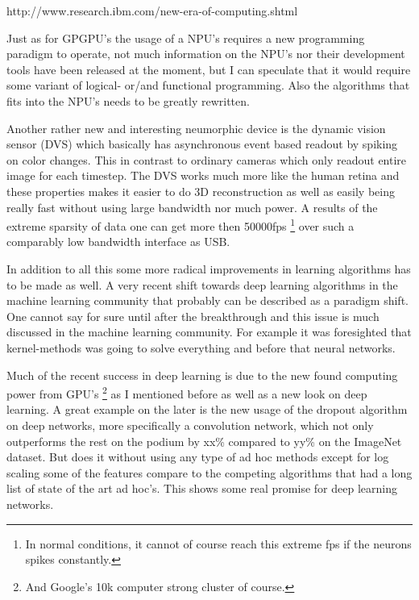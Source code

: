 \documentclass{article}
\begin{document}
    http://www.research.ibm.com/new-era-of-computing.shtml 

    Just as for GPGPU's the usage of a NPU's requires a new programming paradigm to
    operate, not much information on the NPU's nor their development tools
    have been released at the moment, but I can speculate that it would
    require some variant of logical- or/and functional programming. 
    Also the algorithms that fits into the
    NPU's needs to be greatly rewritten.
    
    Another rather new and interesting neumorphic device is the
    dynamic vision sensor (DVS) which basically has asynchronous event based
    readout by spiking on color changes.\cite{dvs} This in contrast to ordinary
    cameras which only readout entire image for each timestep. 
    The DVS works much more like the human retina and
    these properties makes it easier to do 3D reconstruction as well as easily
    being really fast without using large bandwidth nor much power. A results
    of the extreme sparsity of data one can get more then 50000fps
    \footnote{In normal conditions, it cannot of course reach this extreme fps
    if the neurons spikes constantly.}
    over such a comparably low bandwidth interface as USB.

    In addition to all this some more radical improvements in learning
    algorithms has to be made as well. A very recent shift towards deep
    learning algorithms in the machine learning community that probably can be
    described as a paradigm shift. One cannot say for sure until after the
    breakthrough and this issue is much discussed in the machine learning
    community. For example it was foresighted that kernel-methods was going to
    solve everything and before that neural networks.
   
    Much of the recent success in deep learning is due to the new found computing
    power from GPU's \footnote{And Google's 10k computer strong cluster of
    course.} as I mentioned before as well as a new look 
    on deep learning. A great
    example on the later is the new usage of the dropout algorithm on deep networks, 
    more specifically a convolution network, which not only
    outperforms the rest on the podium by xx\% compared to yy\% on the 
    ImageNet dataset.\cite{imagenet}
    But does it without using any type of ad hoc methods except for log scaling some of the
    features compare to the competing algorithms that had a long list of state
    of the art ad hoc's.\cite{dropout} This shows some real promise for deep
    learning networks.
\end{document}
